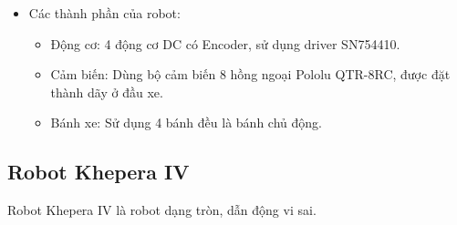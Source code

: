 \begin{itemize}
            \item Các thành phần của robot:
                \begin{itemize}[label=\textendash]
                    \item Động cơ: 4 động cơ DC có Encoder, sử dụng driver SN754410.
                    \item Cảm biến: Dùng bộ cảm biến 8 hồng ngoại Pololu QTR-8RC, được đặt thành dãy ở đầu xe.
                    \item Bánh xe: Sử dụng 4 bánh đều là bánh chủ động.
                \end{itemize}
        \end{itemize}



    \subsection{Robot Khepera IV}
        \hspace*{0.6cm}Robot Khepera IV là robot dạng tròn, dẫn động vi sai.
